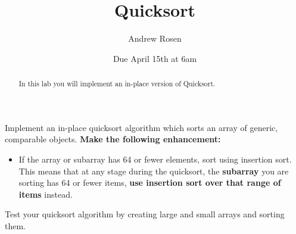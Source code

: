 \documentclass[10pt,letterpaper]{article}
\author{Andrew Rosen}
\title{Quicksort }
\date{Due April 15th at 6am}
\begin{document}
	
	\maketitle
	
	\begin{abstract}
		In this lab you will implement an in-place version of Quicksort.
	\end{abstract}


	Implement an in-place quicksort algorithm which sorts an array of generic, comparable objects.  \textbf{Make the following enhancement:}
	
	\begin{itemize}
		\item If the array or subarray  has 64 or fewer elements, sort using insertion sort. 
		This means that at any stage during the quicksort, the \textbf{subarray} you are sorting has 64 or fewer items, \textbf{use insertion sort over that range of items} instead.
		
	\end{itemize}
	
	Test your quicksort algorithm by creating large and small arrays and sorting them.
	

 	
\end{document}
